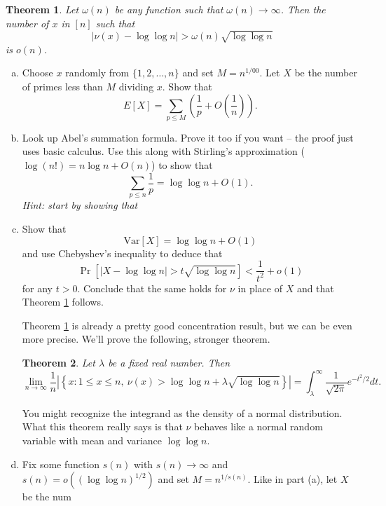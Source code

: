 \documentclass[11pt,letterpaper]{article}
\newcommand{\Var}{\text{Var}}
\newtheorem{theorem}{Theorem}
\begin{document}
\begin{theorem}\label{2mm: bound}
	Let $\omega(n)$ be any function such that $\omega(n)\to \infty$. Then the number of $x$ in $[n]$ such that
	\begin{equation}\label{2mm: prime divisors}
		|\nu(x) - \log\log n| > \omega(n)\sqrt{\log \log n}
	\end{equation}
	is $o(n)$.
\end{theorem}

\begin{enumerate}[(a)]
	\item Choose $x$ randomly from $\{1, 2, \ldots, n\}$ and set $M = n^{1/00}$. Let $X$ be the number of primes less than $M$ dividing $x$. Show that
	\begin{equation}\label{2mm: expectation}
	E[X] = \sum_{p\leq M}\left(\frac{1}{p} + O\left(\frac{1}{n}\right)\right).
	\end{equation}

	\item Look up Abel's summation formula. Prove it too if you want -- the proof just uses basic calculus. Use this along with Stirling's approximation ($\log (n!) = n\log n + O(n)$) to show that 
	\begin{equation}\label{2mm: sum 1/p}
		\sum_{p\leq n}\frac{1}{p} = \log \log n + O(1).
	\end{equation}
	\textit{Hint: start by showing that }
	
	\item Show that
	\begin{equation}\label{2mm: variance}
	    \Var[X] = \log\log n + O(1)
	\end{equation}
	and use Chebyshev's inequality to deduce that
	\[
	\Pr\left[|X-\log\log n| > t\sqrt{\log \log n} \right]<\frac{1}{t^2}+o(1)
	\]
	for any $t>0$. Conclude that the same holds for $\nu$ in place of $X$ and that Theorem \ref{2mm: bound} follows.
	

	Theorem \ref{2mm: bound} is already a pretty good concentration result, but we can be even more precise. We'll prove the following, stronger theorem.
	\begin{theorem}
	    Let $\lambda$ be a fixed real number. Then
	    \[
	    \lim_{n\to \infty}\frac{1}{n}\left|\left\{ x: 1\leq x\leq n,\ \nu(x)>\log \log n + \lambda\sqrt{\log \log n} \right\}\right| = \int_\lambda^\infty \frac{1}{\sqrt{2\pi}}e^{-t^2/2}dt.
	    \]
	\end{theorem}
	You might recognize the integrand as the density of a normal distribution. What this theorem really says is that $\nu$ behaves like a normal random variable with mean and variance $\log\log n$.
	
	\item Fix some function $s(n)$ with $s(n)\to \infty$ and $s(n) = o((\log\log n)^{1/2})$ and set $M = n^{1/s(n)}$. Like in part (a), let $X$ be the num
\end{enumerate}
\end{document}
